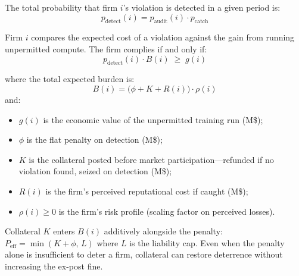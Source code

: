 The total probability that firm $i$'s violation is detected in a given period is:
\begin{equation}
    p_{\text{detect}}(i) = p_{\text{audit}}(i) \cdot p_{\text{catch}}
    \label{eq:detect}
\end{equation}


Firm $i$ compares the expected cost of a violation against the gain from running unpermitted compute. The firm complies if and only if:
\begin{equation}
    p_{\text{detect}}(i) \cdot B(i) \;\geq\; g(i)
    \label{eq:compliance}
\end{equation}

where the total expected burden is:
\begin{equation}
    B(i) = \big(\phi + K + R(i)\big) \cdot \rho(i)
    \label{eq:burden}
\end{equation}
and:
\begin{itemize}
    \item $g(i)$ is the economic value of the unpermitted training run (M\$);
    \item $\phi$ is the flat penalty on detection (M\$);
    \item $K$ is the collateral posted before market participation---refunded if no violation found, seized on detection (M\$);
    \item $R(i)$ is the firm's perceived reputational cost if caught (M\$);
    \item $\rho(i) \geq 0$ is the firm's risk profile (scaling factor on perceived losses).
\end{itemize}

Collateral $K$ enters $B(i)$ additively alongside the penalty: $P_{\text{eff}} = \min(K + \phi,\, L)$ where $L$ is the liability cap. Even when the penalty alone is insufficient to deter a firm, collateral can restore deterrence without increasing the ex-post fine.


